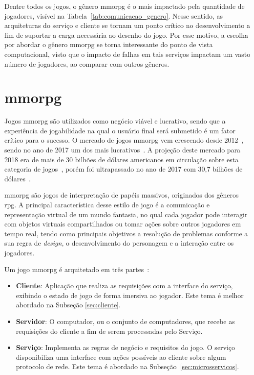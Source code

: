 Dentre todos os jogos, o gênero \ac{mmorpg} é o mais impactado pela quantidade de jogadores\cite{mmo_analytic}, visível na Tabela~\ref{tab:comunicacao_genero}.
%
Nesse sentido, as arquiteturas do serviço e cliente se tornam um ponto crítico no desenvolvimento a fim de suportar a carga necessária ao desenho do jogo.
%
Por esse motivo, a escolha por abordar o gênero \ac{mmorpg} se torna interessante do ponto de vista computacional, visto que o impacto de falhas em tais serviços impactam um vasto número de jogadores, ao comparar com outros gêneros.



\section{\ac{mmorpg}}
\label{sec:mmorpg}



Jogos \ac{mmorpg} são utilizados como negócio viável e lucrativo, sendo que a experiência de jogabilidade na qual o usuário final será submetido é um fator crítico para o sucesso.
%
O mercado de jogos \ac{mmorpg} vem crescendo desde 2012~\cite{new_york_times}, sendo no ano de 2017 um dos mais lucrativos~\cite{statista_2018_mmo}.
%
A projeção deste mercado para 2018 era de mais de 30 bilhões de dólares americanos em circulação sobre esta categoria de jogos~\cite{statista_2018}, porém foi ultrapassado no ano de 2017 com 30,7 bilhões de dólares~\cite{statista_2018_mmo}.



\ac{mmorpg} são jogos de interpretação de papéis massivos, originados dos gêneros \ac{rpg}.
%
A principal característica desse estilo de jogo é a comunicação e representação virtual de um mundo fantasia, no qual cada jogador pode interagir com objetos virtuais compartilhados ou tomar ações sobre outros jogadores em tempo real, tendo como principais objetivos a resolução de problemas conforme a sua regra de \textit{design}, o desenvolvimento do personagem e a interação entre os jogadores\cite{video_game_technologies}.



Um jogo \ac{mmorpg} é arquitetado em três partes~\cite{mmo_analytic}:
\begin{itemize}
  \item \textbf{Cliente}: Aplicação que realiza as requisições com a interface do serviço, exibindo o estado de jogo de forma imersiva ao jogador. Este tema é melhor abordado na Subseção \ref{sec:cliente}.
  \item \textbf{Servidor}: O computador, ou o conjunto de computadores, que recebe as requisições do cliente a fim de serem processadas pelo Serviço.
  \item \textbf{Serviço}: Implementa as regras de negócio e requisitos do jogo. O serviço disponibiliza uma interface com ações possíveis ao cliente sobre algum protocolo de rede. Este tema é abordado na Subseção~\ref{sec:microsservicos}.
\end{itemize}

